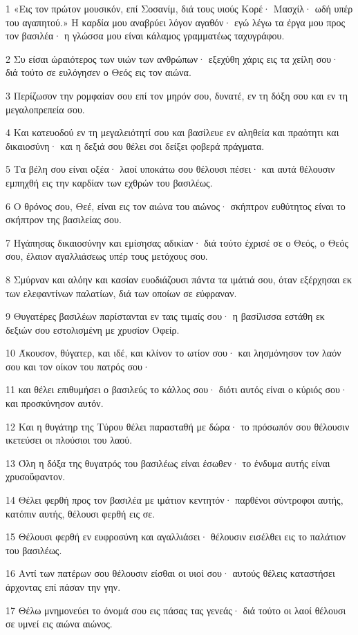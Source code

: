 \par 1 «Εις τον πρώτον μουσικόν, επί Σοσανίμ, διά τους υιούς Κορέ· Μασχίλ· ωδή υπέρ του αγαπητού.» Η καρδία μου αναβρύει λόγον αγαθόν· εγώ λέγω τα έργα μου προς τον βασιλέα· η γλώσσα μου είναι κάλαμος γραμματέως ταχυγράφου.
\par 2 Συ είσαι ώραιότερος των υιών των ανθρώπων· εξεχύθη χάρις εις τα χείλη σου· διά τούτο σε ευλόγησεν ο Θεός εις τον αιώνα.
\par 3 Περίζωσον την ρομφαίαν σου επί τον μηρόν σου, δυνατέ, εν τη δόξη σου και εν τη μεγαλοπρεπεία σου.
\par 4 Και κατευοδού εν τη μεγαλειότητί σου και βασίλευε εν αληθεία και πραότητι και δικαιοσύνη· και η δεξιά σου θέλει σοι δείξει φοβερά πράγματα.
\par 5 Τα βέλη σου είναι οξέα· λαοί υποκάτω σου θέλουσι πέσει· και αυτά θέλουσιν εμπηχθή εις την καρδίαν των εχθρών του βασιλέως.
\par 6 Ο θρόνος σου, Θεέ, είναι εις τον αιώνα του αιώνος· σκήπτρον ευθύτητος είναι το σκήπτρον της βασιλείας σου.
\par 7 Ηγάπησας δικαιοσύνην και εμίσησας αδικίαν· διά τούτο έχρισέ σε ο Θεός, ο Θεός σου, έλαιον αγαλλιάσεως υπέρ τους μετόχους σου.
\par 8 Σμύρναν και αλόην και κασίαν ευοδιάζουσι πάντα τα ιμάτιά σου, όταν εξέρχησαι εκ των ελεφαντίνων παλατίων, διά των οποίων σε εύφραναν.
\par 9 Θυγατέρες βασιλέων παρίστανται εν ταις τιμαίς σου· η βασίλισσα εστάθη εκ δεξιών σου εστολισμένη με χρυσίον Οφείρ.
\par 10 Άκουσον, θύγατερ, και ιδέ, και κλίνον το ωτίον σου· και λησμόνησον τον λαόν σου και τον οίκον του πατρός σου·
\par 11 και θέλει επιθυμήσει ο βασιλεύς το κάλλος σου· διότι αυτός είναι ο κύριός σου· και προσκύνησον αυτόν.
\par 12 Και η θυγάτηρ της Τύρου θέλει παρασταθή με δώρα· το πρόσωπόν σου θέλουσιν ικετεύσει οι πλούσιοι του λαού.
\par 13 Όλη η δόξα της θυγατρός του βασιλέως είναι έσωθεν· το ένδυμα αυτής είναι χρυσοΰφαντον.
\par 14 Θέλει φερθή προς τον βασιλέα με ιμάτιον κεντητόν· παρθένοι σύντροφοι αυτής, κατόπιν αυτής, θέλουσι φερθή εις σε.
\par 15 Θέλουσι φερθή εν ευφροσύνη και αγαλλιάσει· θέλουσιν εισέλθει εις το παλάτιον του βασιλέως.
\par 16 Αντί των πατέρων σου θέλουσιν είσθαι οι υιοί σου· αυτούς θέλεις καταστήσει άρχοντας επί πάσαν την γην.
\par 17 Θέλω μνημονεύει το όνομά σου εις πάσας τας γενεάς· διά τούτο οι λαοί θέλουσι σε υμνεί εις αιώνα αιώνος.

